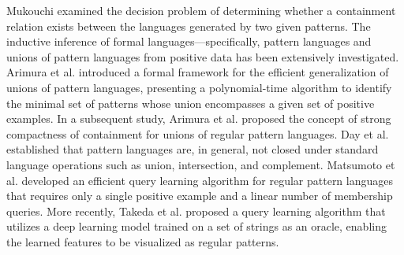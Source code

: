 %
%

%
Mukouchi \cite{Mukouchi1992} examined the decision problem of determining whether a containment relation exists between the languages generated by two given patterns. The inductive inference of formal languages—specifically, pattern languages \cite{Angluin1980b} and unions of pattern languages \cite{Wright1989,Shinohara2000} from positive data has been extensively investigated. Arimura et al. \cite{Arimura1994} introduced a formal framework for the efficient generalization of unions of pattern languages, presenting a polynomial-time algorithm to identify the minimal set of patterns whose union encompasses a given set of positive examples. In a subsequent study, Arimura et al. \cite{Arimura1996} proposed the concept of strong compactness of containment for unions of regular pattern languages. Day et al. \cite{Day2017} established that pattern languages are, in general, not closed under standard language operations such as union, intersection, and complement. Matsumoto et al. \cite{Matsumoto2020} developed an efficient query learning algorithm for regular pattern languages that requires only a single positive example and a linear number of membership queries. More recently, Takeda et al. \cite{Taketa2022} proposed a query learning algorithm that utilizes a deep learning model trained on a set of strings as an oracle, enabling the learned features to be visualized as regular patterns.

